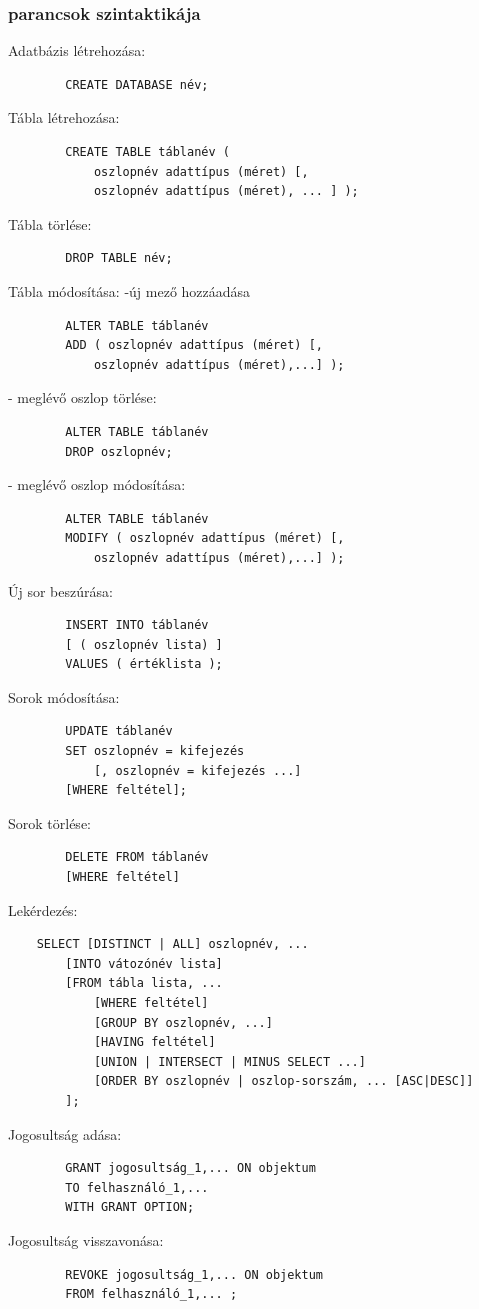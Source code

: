 \subsubsection{parancsok szintaktikája}
\begin{multicols}{2}
	Adatbázis létrehozása:
	\begin{verbatim}
		CREATE DATABASE név;
	\end{verbatim}
	Tábla létrehozása:
	\begin{verbatim}
		CREATE TABLE táblanév (
			oszlopnév adattípus (méret) [,
			oszlopnév adattípus (méret), ... ] );
	\end{verbatim}
	Tábla törlése:
	\begin{verbatim}
		DROP TABLE név;
	\end{verbatim}
	Tábla módosítása:
	-új mező hozzáadása
	\begin{verbatim}
		ALTER TABLE táblanév
		ADD ( oszlopnév adattípus (méret) [,
			oszlopnév adattípus (méret),...] );
	\end{verbatim}
	- meglévő oszlop törlése:
	\begin{verbatim}
		ALTER TABLE táblanév
		DROP oszlopnév;
	\end{verbatim}
	- meglévő oszlop módosítása:
	\begin{verbatim}
		ALTER TABLE táblanév
		MODIFY ( oszlopnév adattípus (méret) [,
			oszlopnév adattípus (méret),...] );
	\end{verbatim}
	Új sor beszúrása:
	\begin{verbatim}
		INSERT INTO táblanév
		[ ( oszlopnév lista) ]
		VALUES ( értéklista );
	\end{verbatim}
	Sorok módosítása:
	\begin{verbatim}
		UPDATE táblanév
		SET oszlopnév = kifejezés
			[, oszlopnév = kifejezés ...]
		[WHERE feltétel];
	\end{verbatim}
	Sorok törlése:
	\begin{verbatim}
		DELETE FROM táblanév
		[WHERE feltétel]
	\end{verbatim}
	Lekérdezés:
	\begin{verbatim}
	SELECT [DISTINCT | ALL] oszlopnév, ...
		[INTO vátozónév lista]
		[FROM tábla lista, ...
			[WHERE feltétel]
			[GROUP BY oszlopnév, ...]
			[HAVING feltétel]
			[UNION | INTERSECT | MINUS SELECT ...]
			[ORDER BY oszlopnév | oszlop-sorszám, ... [ASC|DESC]]
		];
	\end{verbatim}
	Jogosultság adása:
	\begin{verbatim}
		GRANT jogosultság_1,... ON objektum
		TO felhasználó_1,...
		WITH GRANT OPTION;
	\end{verbatim}
	Jogosultság visszavonása:
	\begin{verbatim}
		REVOKE jogosultság_1,... ON objektum 
		FROM felhasználó_1,... ;
	\end{verbatim}
\end{multicols}